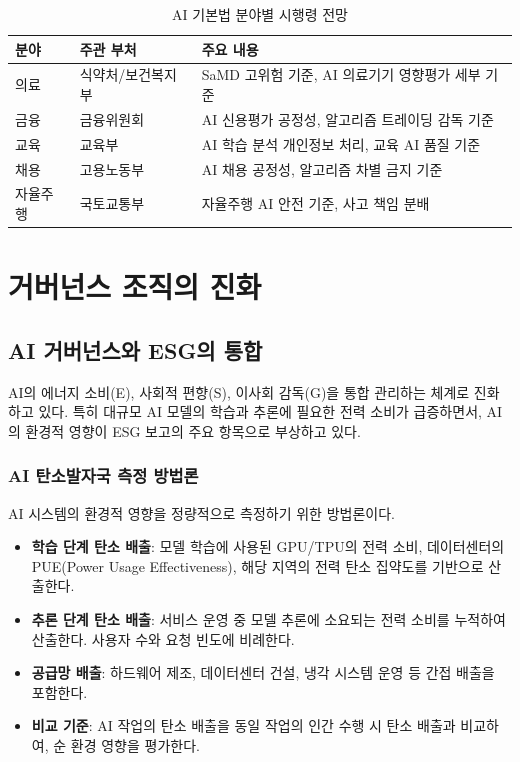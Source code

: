 \begin{table}[htbp]
\centering
\caption{AI 기본법 분야별 시행령 전망}
\label{tab:20_subordinate}
\begin{tabularx}{\textwidth}{p{2cm}p{3cm}X}
\toprule
\textbf{분야} & \textbf{주관 부처} & \textbf{주요 내용} \\
\midrule
의료 & 식약처/보건복지부 & SaMD 고위험 기준, AI 의료기기 영향평가 세부 기준 \\
금융 & 금융위원회 & AI 신용평가 공정성, 알고리즘 트레이딩 감독 기준 \\
교육 & 교육부 & AI 학습 분석 개인정보 처리, 교육 AI 품질 기준 \\
채용 & 고용노동부 & AI 채용 공정성, 알고리즘 차별 금지 기준 \\
자율주행 & 국토교통부 & 자율주행 AI 안전 기준, 사고 책임 분배 \\
\bottomrule
\end{tabularx}
\end{table}

\section{거버넌스 조직의 진화}
\label{sec:20.3}

\subsection{AI 거버넌스와 ESG의 통합}
\label{sec:20.3.1}

AI의 에너지 소비(E), 사회적 편향(S), 이사회 감독(G)을 통합 관리하는 체계로 진화하고 있다. 특히 대규모 AI 모델의 학습과 추론에 필요한 전력 소비가 급증하면서, AI의 환경적 영향이 ESG 보고의 주요 항목으로 부상하고 있다.

\subsubsection{AI 탄소발자국 측정 방법론}

AI 시스템의 환경적 영향을 정량적으로 측정하기 위한 방법론이다.

\begin{itemize}
 \item \textbf{학습 단계 탄소 배출}: 모델 학습에 사용된 GPU/TPU의 전력 소비, 데이터센터의 PUE(Power Usage Effectiveness), 해당 지역의 전력 탄소 집약도를 기반으로 산출한다.
 \item \textbf{추론 단계 탄소 배출}: 서비스 운영 중 모델 추론에 소요되는 전력 소비를 누적하여 산출한다. 사용자 수와 요청 빈도에 비례한다.
 \item \textbf{공급망 배출}: 하드웨어 제조, 데이터센터 건설, 냉각 시스템 운영 등 간접 배출을 포함한다.
 \item \textbf{비교 기준}: AI 작업의 탄소 배출을 동일 작업의 인간 수행 시 탄소 배출과 비교하여, 순 환경 영향을 평가한다.
\end{itemize}

